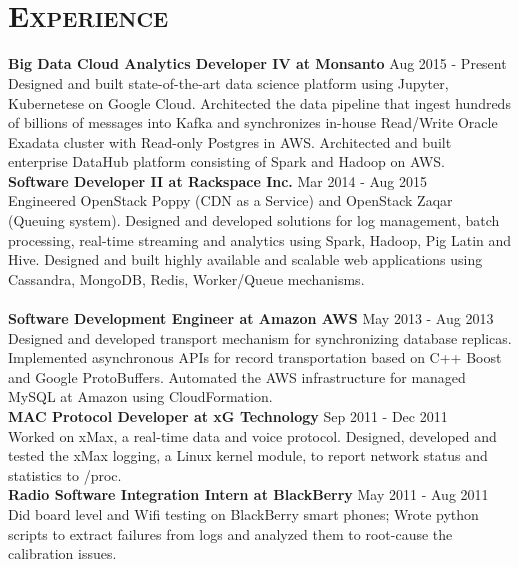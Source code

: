\begin{resume}
\begin{formatb}
  \\
  \body\\
\end{formatb}

\section{\textsc{Experience}}
\textbf{Big Data Cloud Analytics Developer IV at Monsanto} \hfill Aug 2015 - Present\\
Designed and built state-of-the-art data science platform using Jupyter, Kubernetese on Google Cloud. Architected the data pipeline that ingest hundreds of billions of messages into Kafka and synchronizes in-house Read/Write Oracle Exadata cluster with Read-only Postgres in AWS. Architected and built enterprise DataHub platform consisting of Spark and Hadoop on AWS.\\
\textbf{Software Developer II at Rackspace Inc.} \hfill Mar 2014 - Aug 2015\\
Engineered OpenStack Poppy (CDN as a Service) and OpenStack Zaqar (Queuing system). Designed and developed solutions for log management, batch processing, real-time streaming and analytics using Spark, Hadoop, Pig Latin and Hive. Designed and built highly available and scalable web applications using Cassandra, MongoDB, Redis, Worker/Queue mechanisms.\\ \\
\textbf{Software Development Engineer at Amazon AWS} \hfill May 2013 - Aug 2013\\
Designed and developed transport mechanism for synchronizing database replicas. Implemented asynchronous APIs for record transportation based on C++ Boost and Google ProtoBuffers. Automated the AWS infrastructure for managed MySQL at Amazon using CloudFormation.\\
\textbf{MAC Protocol Developer at xG Technology} \hfill Sep 2011 - Dec 2011\\
Worked on xMax, a real-time data and voice protocol. Designed, developed and tested the xMax logging, a Linux kernel module, to report network status and statistics to /proc.\\
\textbf{Radio Software Integration Intern at BlackBerry} \hfill May 2011 - Aug 2011\\
Did board level and Wifi testing on BlackBerry smart phones; Wrote python scripts to extract failures from logs and analyzed them to root-cause the calibration issues.\\

\end{resume}

